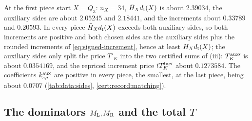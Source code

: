 At the first piece start $X=Q_3$: $n_X=34$, $\bar H_Xd_\mathsf t(X)$ is about
$2.39034$, the auxiliary sides are about $2.05245$ and $2.18441$, and the
increments about $0.33789$ and $0.20593$. In every piece $\bar H_Xd_\mathsf t(X)$
exceeds both auxiliary sides, so both increments are positive and both chosen sides are the auxiliary sides plus the rounded increments of \eqref{eq:signed-increment}, hence at least $\bar H_Xd_\mathsf t(X)$; the auxiliary sides only
split the price $T'_K$ into the two certified sums of (iii): $T^{\rm aux\prime}_K$ is
about $0.0354169$, and the repriced increment price $tT^{\rm inc\prime}_K$ about
$0.1273584$. The coefficients
$k^{\rm aux}_{s,i}$ are positive in every piece, the smallest, at the last piece,
being about $0.0707$ (\cref{tab:data:sides}, \cref{cert:record:matching}).

\subsection{The dominators \texorpdfstring{$M_{\rm L},M_{\rm R}$}{M\_L,M\_R} and the total \texorpdfstring{$T$}{T}}\label{subsec:matching-envelopes}

